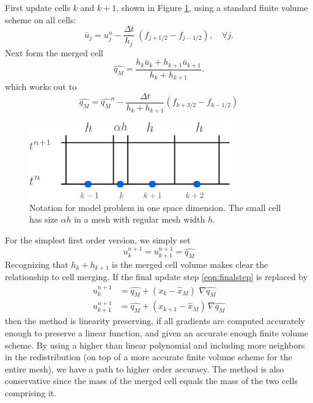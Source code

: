 First  update cells $k$ and $k+1$, shown in Figure \ref{fig:modelProblem1},  using a 
standard finite volume scheme on all cells:
\begin{equation}
\bar{u}_j = u_j^n - \frac{\Delta t}{h_j} \; (f_{j+1/2} - f_{j-1/2} ), 
\quad \forall j.
\label{eqn:fvupdate}
\end{equation}
Next form the merged cell
\begin{equation}
\widehat{q_M} =  \frac{ h_k \bar{u}_k + h_{k+1} \bar{u}_{k+1} } {h_k +
h_{k+1}} .
\label{eqn:mergestep}
\end{equation}
which works out to
\begin{equation}
\widehat{q_M} = \widehat{q_M}^n - 
\frac{\Delta t}{h_k + h_{k+1}} (f_{k+3/2} - f_{k-1/2})
\end{equation}

\begin{figure}
\begin{center}
\includegraphics[height=1.3in]{figs/1dfig.pdf}
\caption{\sf Notation for model problem in one space dimension. The small
cell has size $\alpha h$ in a mesh with regular mesh width $h$.}
\label{fig:modelProblem1}
\end{center}
\end{figure}


For the simplest first order version, we simply set
\begin{equation}
u_k^{n+1} = u_{k+1}^{n+1} = \widehat{q_M} 
\label{eqn:finalstep}
\end{equation}
Recognizing that $h_k+h_{k+1}$ is the merged cell volume makes 
clear the relationship to cell merging.
If the final update step \eqref{eqn:finalstep}  is replaced by 
\begin{equation}
\begin{split}
u_k^{n+1} &= \widehat{q_M} +  (x_k - \widehat{x}_M) \,\, \nabla \widehat{q_M}\\
u_{k+1}^{n+1} &= \widehat{q_M} +  (x_{k+1} - \widehat{x}_M) \, \nabla \widehat{q_M}
\end{split}
\end{equation}
then the method is linearity preserving, 
if all gradients are computed accurately enough to preserve a linear function, and
given an accurate enough finite volume scheme.  
By using a higher than linear polynomial and
including more neighbors in the
redistribution (on top of a more accurate finite volume scheme for the
entire mesh),
we have a path to higher order accuracy.
The method is also conservative since the mass of the merged cell equals the 
mass of the two cells comprising it.



